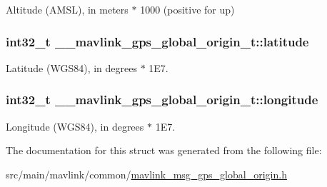 Altitude (A\+M\+S\+L), in meters $\ast$ 1000 (positive for up) 

\hypertarget{struct____mavlink__gps__global__origin__t_ab78807fb15062419bf5452c3294235bc}{
\subsubsection[{latitude}]{\setlength{\rightskip}{0pt plus 5cm}int32\+\_\+t \+\_\+\+\_\+mavlink\+\_\+gps\+\_\+global\+\_\+origin\+\_\+t\+::latitude}}\label{struct____mavlink__gps__global__origin__t_ab78807fb15062419bf5452c3294235bc}


Latitude (W\+G\+S84), in degrees $\ast$ 1\+E7. 

\hypertarget{struct____mavlink__gps__global__origin__t_a52156dc446e0be0bc5cbf4247e194349}{
\subsubsection[{longitude}]{\setlength{\rightskip}{0pt plus 5cm}int32\+\_\+t \+\_\+\+\_\+mavlink\+\_\+gps\+\_\+global\+\_\+origin\+\_\+t\+::longitude}}\label{struct____mavlink__gps__global__origin__t_a52156dc446e0be0bc5cbf4247e194349}


Longitude (W\+G\+S84), in degrees $\ast$ 1\+E7. 



The documentation for this struct was generated from the following file\+:\begin{DoxyCompactItemize}
\item 
src/main/mavlink/common/\hyperlink{mavlink__msg__gps__global__origin_8h}{mavlink\+\_\+msg\+\_\+gps\+\_\+global\+\_\+origin.\+h}\end{DoxyCompactItemize}
